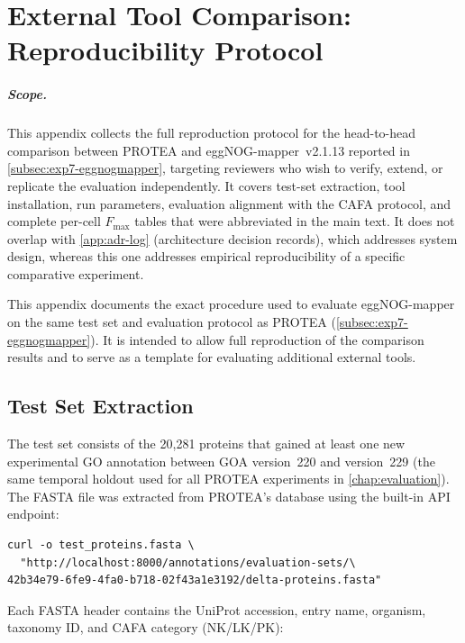 \chapter{External Tool Comparison: Reproducibility Protocol}
\label{app:external-comparison}

\paragraph{Scope.}
This appendix collects the full reproduction protocol for the head-to-head
comparison between PROTEA and eggNOG-mapper~v2.1.13 reported in
\cref{subsec:exp7-eggnogmapper}, targeting reviewers who wish to verify,
extend, or replicate the evaluation independently. It covers test-set
extraction, tool installation, run parameters, evaluation alignment with
the CAFA protocol, and complete per-cell $F_{\max}$ tables that were
abbreviated in the main text. It does not overlap with
\cref{app:adr-log} (architecture decision records), which addresses system
design, whereas this one addresses empirical reproducibility of a specific
comparative experiment.

This appendix documents the exact procedure used to evaluate eggNOG-mapper
on the same test set and evaluation protocol as PROTEA (\cref{subsec:exp7-eggnogmapper}).
It is intended to allow full reproduction of the comparison results and to
serve as a template for evaluating additional external tools.

\section{Test Set Extraction}
\label{app:ext-test-set}

The test set consists of the 20{,}281 proteins that gained at least one new
experimental GO annotation between GOA version~220 and version~229 (the same
temporal holdout used for all PROTEA experiments in \cref{chap:evaluation}).
The FASTA file was extracted from PROTEA's database using the built-in API
endpoint:

\begin{verbatim}
curl -o test_proteins.fasta \
  "http://localhost:8000/annotations/evaluation-sets/\
42b34e79-6fe9-4fa0-b718-02f43a1e3192/delta-proteins.fasta"
\end{verbatim}

Each FASTA header contains the UniProt accession, entry name, organism,
taxonomy ID, and CAFA category (NK/LK/PK):

